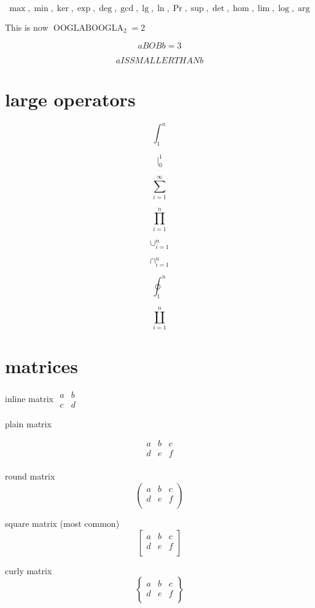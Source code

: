 \documentclass[12pt]{report}
\DeclareMathOperator*{\mysymbol}{OOGLABOOGLA} %
\begin{document}
$$\max, \min, \ker, \exp, \deg, \gcd, \lg, \ln, \Pr, \sup, \det, \hom, \lim, \log, \arg$$

This is now $\mysymbol_2 = 2$

$$a \mathbin{BOB} b = 3$$ %

$$a \mathrel{IS SMALLER THAN} b$$ %

\section{large operators}
$$\int_{1}^n$$

$$\rvert_0^1$$

$$\sum_{i = 1}^\infty$$

$$\prod_{i = 1}^n$$

$$\cup_{i = 1}^n$$

$$\cap_{i = 1}^n$$

$$\oint_1^n$$

$$\coprod_{i = 1}^n$$

\section{matrices}
inline matrix $\begin{smallmatrix} a & b\\ c & d \end{smallmatrix}$ 


plain matrix  %

$$\begin{matrix}
a & b & c \\
d & e & f \\
\end{matrix}$$

round matrix 
$$\begin{pmatrix}
a & b & c \\
d & e & f \\
\end{pmatrix}$$

square matrix (most common)
$$\begin{bmatrix}
a & b & c \\
d & e & f \\
\end{bmatrix}$$

curly matrix 
$$\begin{Bmatrix}
a & b & c \\
d & e & f \\
\end{Bmatrix}$$
\end{document}

